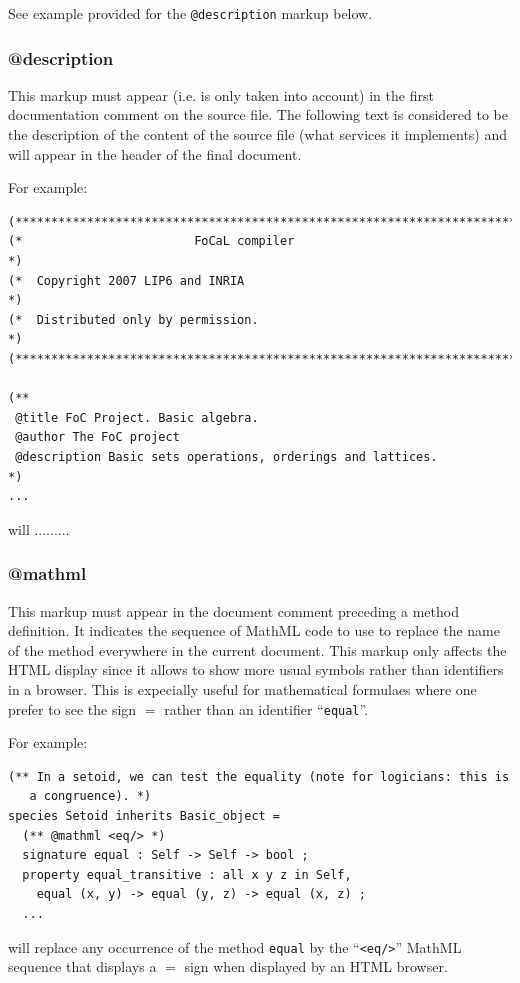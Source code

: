 See example provided for the {\tt @description} markup below.



\subsubsection{@description}
This markup must appear (i.e. is only taken into account) in the first
documentation comment on the source file. The following text is
considered to be the description of the content of the source file
(what services it implements) and will appear in the header of the
final document.

For example:
{\scriptsize
\begin{lstlisting}
(***********************************************************************)
(*                        FoCaL compiler                               *)
(*  Copyright 2007 LIP6 and INRIA                                      *)
(*  Distributed only by permission.                                    *)
(***********************************************************************)

(**
 @title FoC Project. Basic algebra.
 @author The FoC project
 @description Basic sets operations, orderings and lattices.
*)
...
\end{lstlisting}
}
will .........

\subsubsection{@mathml}
This markup must appear in the document comment preceding a method
definition. It indicates the sequence of MathML code to use to replace
the name of the method everywhere in the current document. This markup
only affects the HTML display since it allows to show more usual
symbols rather than identifiers in a browser. This is expecially
useful for mathematical formulaes where one prefer to see the sign $=$
rather than an identifier ``{\tt equal}''.

For example:
{\scriptsize
\begin{lstlisting}
(** In a setoid, we can test the equality (note for logicians: this is
   a congruence). *)
species Setoid inherits Basic_object =
  (** @mathml <eq/> *)
  signature equal : Self -> Self -> bool ;
  property equal_transitive : all x y z in Self,
    equal (x, y) -> equal (y, z) -> equal (x, z) ;
  ...
\end{lstlisting}
}
will replace any occurrence of the method {\tt equal} by the
``\verb+<eq/>+'' MathML sequence that displays a $=$ sign when
displayed by an HTML browser.

